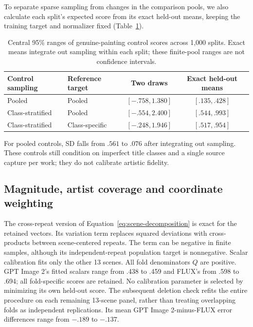 To separate sparse sampling from changes in the comparison pools, we also
calculate each split's expected score from its exact held-out means, keeping
the training target and normalizer fixed (Table~\ref{tab:painting-control-ranges}).

\begin{table}[htbp]
\centering\small
\begin{tabular}{llcc}
\toprule
Control sampling & Reference target & Two draws & Exact held-out means\\
\midrule
Pooled & Pooled & $[-.758,1.380]$ & $[.135,.428]$\\
Class-stratified & Pooled & $[-.554,2.400]$ & $[.544,.993]$\\
Class-stratified & Class-specific & $[-.248,1.946]$ & $[.517,.954]$\\
\bottomrule
\end{tabular}
\caption{Central 95\% ranges of genuine-painting control scores across 1,000
splits. Exact means integrate out sampling within each split; these finite-pool
ranges are not confidence intervals.}
\label{tab:painting-control-ranges}
\end{table}

For pooled controls, SD falls from $.561$ to $.076$ after integrating out
sampling. These controls still condition on imperfect title classes and a
single source capture per work; they do not calibrate artistic fidelity.


\FloatBarrier

\subsection{Magnitude, artist coverage and coordinate weighting}\label{app:magnitude-coverage}
The cross-repeat version of Equation~\ref{eq:scene-decomposition} is exact for
the retained vectors. Its variation term replaces squared deviations with
cross-products between scene-centered repeats. The term can be negative in
finite samples, although its independent-repeat population target is nonnegative.
Scalar calibration fits only the other 13 scenes. All fold denominators $Q$
are positive. GPT Image 2's fitted scalars range from .438 to .459 and FLUX's
from .598 to .694; all fold-specific scores are retained. No calibration
parameter is selected by minimizing its own held-out score. The subsequent
deletion check refits the entire procedure on
each remaining 13-scene panel, rather than treating overlapping folds as
independent replications. Its mean GPT Image 2-minus-FLUX error differences
range from $-.189$ to $-.137$.

